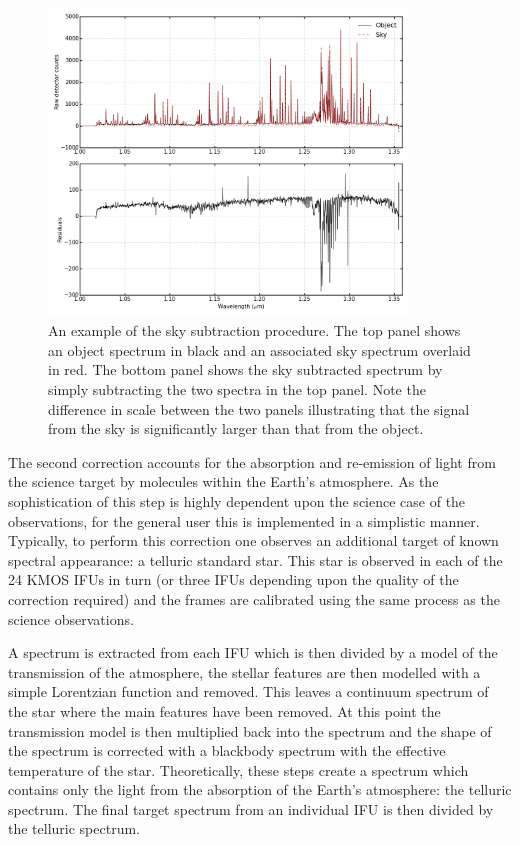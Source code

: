\begin{figure}
 \centering
 \includegraphics[width=0.85\textwidth]{kmos/NGC55-19-skysub_basic}
 \caption[An example of the sky subtraction procedure]{An example of the sky subtraction procedure. The top panel shows an object spectrum in black and an associated sky spectrum overlaid in red.
 The bottom panel shows the sky subtracted spectrum by simply subtracting the two spectra in the top panel.
 Note the difference in scale between the two panels illustrating that the signal from the sky is significantly larger than that from the object.
 \label{fig:skysub}}
\end{figure}

The second correction accounts for the absorption and re-emission of light from the science target by molecules within the Earth's atmosphere.
As the sophistication of this step is highly dependent upon the science case of the observations, for the general user this is implemented in a simplistic manner.
Typically, to perform this correction one observes an additional target of known spectral appearance: a telluric standard star.
This star is observed in each of the 24 KMOS IFUs in turn (or three IFUs depending upon the quality of the correction required) and the frames are calibrated using the same process as the science observations.

A spectrum is extracted from each IFU which is then divided by a model of the transmission of the atmosphere, the stellar features are then modelled with a simple Lorentzian function and removed.
This leaves a continuum spectrum of the star where the main features have been removed.
At this point the transmission model is then multiplied back into the spectrum and the shape of the spectrum is corrected with a blackbody spectrum with the effective temperature of the star.
Theoretically, these steps create a spectrum which contains only the light from the absorption of the Earth's atmosphere: the telluric spectrum.
The final target spectrum from an individual IFU is then divided by the telluric spectrum.

